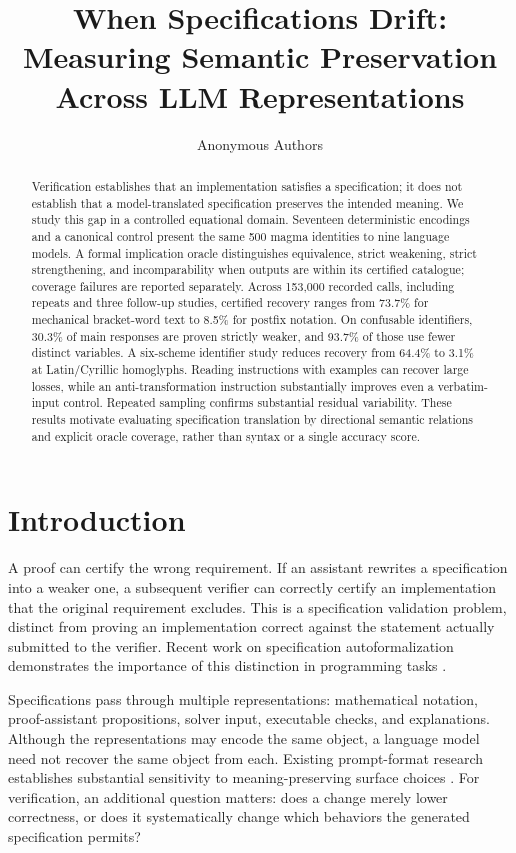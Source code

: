 \documentclass{article}
\title{When Specifications Drift:\\Measuring Semantic Preservation Across LLM Representations}
\author{Anonymous Authors}
\newcommand{\pct}{\%}
\begin{document}
\maketitle

\begin{abstract}
Verification establishes that an implementation satisfies a specification; it does
not establish that a model-translated specification preserves the intended
meaning. We study this gap in a controlled equational domain. Seventeen
deterministic encodings and a canonical control present the same 500 magma
identities to nine language models. A formal implication oracle distinguishes
equivalence, strict weakening, strict strengthening, and incomparability when
outputs are within its certified catalogue; coverage failures are reported
separately. Across 153,000 recorded calls, including repeats and three follow-up
studies, certified recovery ranges from 73.7\pct{} for mechanical bracket-word
text to 8.5\pct{} for postfix notation. On confusable identifiers, 30.3\pct{} of
main responses are proven strictly weaker, and 93.7\pct{} of those use fewer
distinct variables. A six-scheme identifier study reduces recovery from
64.4\pct{} to 3.1\pct{} at Latin/Cyrillic homoglyphs. Reading instructions with
examples can recover large losses, while an anti-transformation instruction
substantially improves even a verbatim-input control. Repeated sampling confirms
substantial residual variability. These results motivate evaluating specification
translation by directional semantic relations and explicit oracle coverage,
rather than syntax or a single accuracy score.
\end{abstract}

\section{Introduction}
\label{sec:intro}

A proof can certify the wrong requirement. If an assistant rewrites a
specification into a weaker one, a subsequent verifier can correctly certify an
implementation that the original requirement excludes. This is a specification
validation problem, distinct from proving an implementation correct against the
statement actually submitted to the verifier. Recent work on specification
autoformalization demonstrates the importance of this distinction in programming
tasks \citep{agarwal2026specgym}.

Specifications pass through multiple representations: mathematical notation,
proof-assistant propositions, solver input, executable checks, and explanations.
Although the representations may encode the same object, a language model need
not recover the same object from each. Existing prompt-format research establishes
substantial sensitivity to meaning-preserving surface choices
\citep{sclar2024format}. For verification, an additional question matters: does a
change merely lower correctness, or does it systematically change which
behaviors the generated specification permits?
\end{document}
